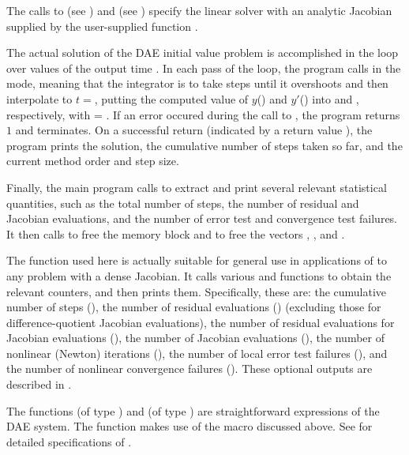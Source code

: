 The calls to  (see ) and 
 (see ) specify the {\idadense}
linear solver with an analytic Jacobian supplied by the user-supplied function
.

The actual solution of the DAE initial value problem is accomplished in
the loop over values of the output time .  In each pass of the
loop, the program calls  in the  mode, meaning that
the integrator is to take steps until it overshoots  and then
interpolate to $t =  $, putting the computed value of $y$()
and $y'$() into  and , respectively, with  = .
If an error occured during the call to , the program returns $1$
and terminates.
On a successful return (indicated by a return value ), the program
prints the solution, the cumulative number of steps taken so far, and the 
current method order and step size.

Finally, the main program calls  to extract and
print several relevant statistical quantities, such as the total
number of steps, the number of residual and Jacobian evaluations, and
the number of error test and convergence test failures.  It then calls
 to free the {\ida} memory block and 
to free the vectors , , and .

The function  used here is actually suitable for
general use in applications of {\ida} to any problem with a dense
Jacobian.  It calls various  and 
functions to obtain the relevant counters, and then prints them.
Specifically, these are: the cumulative number of steps (), 
the number of residual evaluations () (excluding those for
difference-quotient Jacobian evaluations),
the number of residual evaluations for Jacobian evaluations (),
the number of Jacobian evaluations (),
the number of nonlinear (Newton) iterations (),
the number of local error test failures (),
and the number of nonlinear convergence failures ().
These optional outputs are described in .

The functions  (of type ) and  (of type
) are straightforward expressions of the DAE system. 
The function  makes use of the macro  discussed above.
See  for detailed specifications of .

